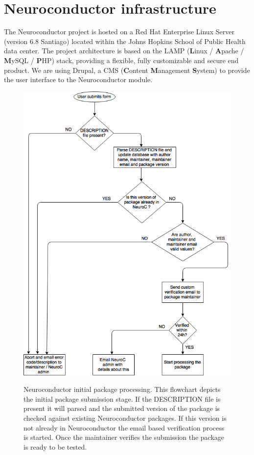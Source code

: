 \documentclass[]{elsarticle} %
\begin{document}
\section{Neuroconductor infrastructure}\label{sec:backend}
The Neuroconductor project is hosted on a Red Hat Enterprise Linux Server (version 6.8 Santiago) located within the Johns Hopkins School of Public Health data center. The project architecture is based on the LAMP (\textbf{L}inux / \textbf{A}pache / \textbf{M}ySQL / \textbf{P}HP) stack, providing a flexible, fully customizable and secure end product. We are using Drupal, a CMS (\textbf{C}ontent \textbf{M}anagement \textbf{S}ystem) to provide the user interface to the Neuroconductor module. 

\begin{figure}[!ht]
  \begin{center}
    \caption{Neuroconductor initial package processing. This flowchart depicts the initial package submission stage. If the DESCRIPTION file is present it will parsed and the submitted version of the package is checked against existing Neuroconductor packages. If this version is not already in Neuroconductor the email based verification process is started. Once the maintainer verifies the submission the package is ready to be tested.}
    \label{fig:stage1}
    \includegraphics[height=0.9\textheight]{flow_stage1_draft.png}\label{fig:package_lifetime_1}
%
  \end{center}
\end{figure}
\end{document}
